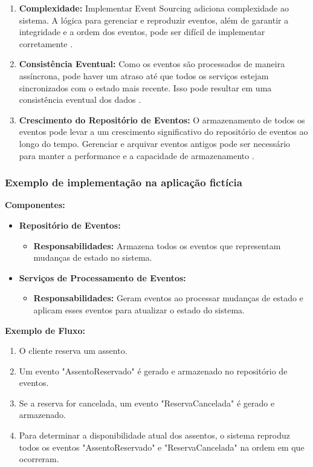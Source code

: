 \begin{enumerate}
    \item \textbf{Complexidade:} Implementar Event Sourcing adiciona complexidade ao sistema. A lógica para gerenciar e reproduzir eventos, além de garantir a integridade e a ordem dos eventos, pode ser difícil de implementar corretamente \cite{richardson2018}.
    \item \textbf{Consistência Eventual:} Como os eventos são processados de maneira assíncrona, pode haver um atraso até que todos os serviços estejam sincronizados com o estado mais recente. Isso pode resultar em uma consistência eventual dos dados \cite{vernon2013}.
    \item \textbf{Crescimento do Repositório de Eventos:} O armazenamento de todos os eventos pode levar a um crescimento significativo do repositório de eventos ao longo do tempo. Gerenciar e arquivar eventos antigos pode ser necessário para manter a performance e a capacidade de armazenamento \cite{fowler2005}.
\end{enumerate}

\subsubsection{Exemplo de implementação na aplicação fictícia}

\textbf{Componentes:}

\begin{itemize}
    \item \textbf{Repositório de Eventos:}
    \begin{itemize}
        \item \textbf{Responsabilidades:} Armazena todos os eventos que representam mudanças de estado no sistema.
    \end{itemize}

    \item \textbf{Serviços de Processamento de Eventos:}
    \begin{itemize}
        \item \textbf{Responsabilidades:} Geram eventos ao processar mudanças de estado e aplicam esses eventos para atualizar o estado do sistema.
    \end{itemize}
\end{itemize}

\textbf{Exemplo de Fluxo:}

\begin{enumerate}
    \item O cliente reserva um assento.
    \item Um evento "AssentoReservado" é gerado e armazenado no repositório de eventos.
    \item Se a reserva for cancelada, um evento "ReservaCancelada" é gerado e armazenado.
    \item Para determinar a disponibilidade atual dos assentos, o sistema reproduz todos os eventos "AssentoReservado" e "ReservaCancelada" na ordem em que ocorreram.
\end{enumerate}

